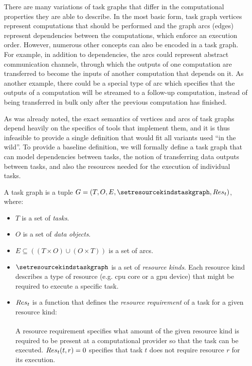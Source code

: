 There are many variations of task graphs that differ in the computational properties they are able
to describe. In the most basic form, task graph vertices represent computations that should be performed
and the graph arcs (edges) represent dependencies between the computations, which enforce an execution order. However, numerous other concepts can also be encoded in a task
graph. For example, in addition to dependencies, the arcs could represent abstract communication
channels, through which the outputs of one computation are transferred to become the inputs of
another computation that depends on it. As another example, there could be a special type of arc
which specifies that the outputs of a computation will be streamed to a follow-up computation,
instead of being transferred in bulk only after the previous computation has finished.

As was already noted, the exact semantics of vertices and arcs of task graphs depend heavily on the
specifics of tools that implement them, and it is thus infeasible to provide a single definition
that would fit all variants used ``in the wild''. To provide a baseline definition, we will
formally define a task graph that can model dependencies between tasks, the notion of
transferring data outputs between tasks, and also the resources needed for the execution of
individual tasks.

\newcommand{\alltaskpairs}{\forall t_1\in{}T, \forall t_2\in{}T}

\vspace{2mm} A task graph is a tuple $G = (T, O, E, \setresourcekindstaskgraph, \fntaskres)$, where:
\begin{itemize}[itemsep=0pt]
	\item $T$ is a set of \emph{tasks}.
	\item $O$ is a set of \emph{data objects}.
	\item $E \subseteq ((T\times{}O) \cup (O\times{}T))$ is a set of arcs.
	\item $\setresourcekindstaskgraph$ is a set of \emph{resource kinds}. Each resource kind
	describes a type of resource
	      (e.g. \gls{cpu} core or a \gls{gpu} device)
	      that might be required to execute a specific task.
	\item $Res_t$ is a function that defines the
		\emph{resource requirement} of a task for a given resource kind: \\
		 \\
		A resource requirement specifies what amount of the given resource kind is required to be present
		at a computational provider so that the task can be executed. $Res_t(t, r) = 0$
	specifies that task
		$t$ does not require resource $r$ for its execution.
\end{itemize}

